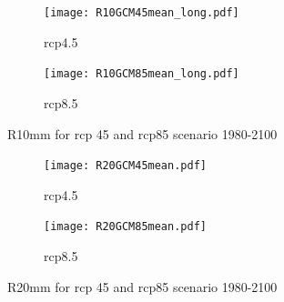 \documentclass{article}
\begin{document}
\begin{figure}[H]
	\centering
	\begin{subfigure}{0.5\textwidth}
		\centering
		\texttt{[image: R10GCM45mean\_long.pdf]}
		\caption{rcp4.5}
	\end{subfigure}%
	\begin{subfigure}{0.5\textwidth}
		\centering
		\texttt{[image: R10GCM85mean\_long.pdf]}
		\caption{rcp8.5}
	\end{subfigure}
	\caption{R10mm for rcp 45 and rcp85 scenario 1980-2100}
	\label{R104585}
\end{figure}

\begin{figure}[H]
	\centering
	\begin{subfigure}{0.5\textwidth}
		\centering
		\texttt{[image: R20GCM45mean.pdf]}
		\caption{rcp4.5}
	\end{subfigure}%
	\begin{subfigure}{0.5\textwidth}
		\centering
		\texttt{[image: R20GCM85mean.pdf]}
		\caption{rcp8.5}
	\end{subfigure}
	\caption{R20mm for rcp 45 and rcp85 scenario 1980-2100}
	\label{R204585}
\end{figure}
\end{document}
